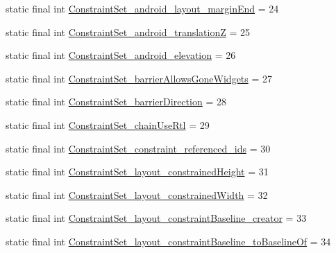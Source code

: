 \begin{DoxyCompactItemize}
\item 
static final int \mbox{\hyperlink{classandroid_1_1support_1_1constraint_1_1_r_1_1styleable_a83bcb97ed6ce0ca89c54e9a368bf3c70}{Constraint\+Set\+\_\+android\+\_\+layout\+\_\+margin\+End}} = 24
\item 
static final int \mbox{\hyperlink{classandroid_1_1support_1_1constraint_1_1_r_1_1styleable_aa97e4df98718576e2033b6f54546a4cf}{Constraint\+Set\+\_\+android\+\_\+translationZ}} = 25
\item 
static final int \mbox{\hyperlink{classandroid_1_1support_1_1constraint_1_1_r_1_1styleable_a1bba70586f967f5e89da0ce11d094afe}{Constraint\+Set\+\_\+android\+\_\+elevation}} = 26
\item 
static final int \mbox{\hyperlink{classandroid_1_1support_1_1constraint_1_1_r_1_1styleable_a4032eefb2166183d384a41be29180f90}{Constraint\+Set\+\_\+barrier\+Allows\+Gone\+Widgets}} = 27
\item 
static final int \mbox{\hyperlink{classandroid_1_1support_1_1constraint_1_1_r_1_1styleable_a029c7bafa6beadb3b8eda9d383459da6}{Constraint\+Set\+\_\+barrier\+Direction}} = 28
\item 
static final int \mbox{\hyperlink{classandroid_1_1support_1_1constraint_1_1_r_1_1styleable_af0420d10b384b7f8340ff46bd6422e79}{Constraint\+Set\+\_\+chain\+Use\+Rtl}} = 29
\item 
static final int \mbox{\hyperlink{classandroid_1_1support_1_1constraint_1_1_r_1_1styleable_a4ab23c187e966b2ab31d8f0e4aaaab98}{Constraint\+Set\+\_\+constraint\+\_\+referenced\+\_\+ids}} = 30
\item 
static final int \mbox{\hyperlink{classandroid_1_1support_1_1constraint_1_1_r_1_1styleable_a2d6b39fd8cf21ecaa4f7b51d9c977b25}{Constraint\+Set\+\_\+layout\+\_\+constrained\+Height}} = 31
\item 
static final int \mbox{\hyperlink{classandroid_1_1support_1_1constraint_1_1_r_1_1styleable_a3ca910d2bfced468b978babf3d42ec73}{Constraint\+Set\+\_\+layout\+\_\+constrained\+Width}} = 32
\item 
static final int \mbox{\hyperlink{classandroid_1_1support_1_1constraint_1_1_r_1_1styleable_a51841e46c2829aa93dbd8a626d493763}{Constraint\+Set\+\_\+layout\+\_\+constraint\+Baseline\+\_\+creator}} = 33
\item 
static final int \mbox{\hyperlink{classandroid_1_1support_1_1constraint_1_1_r_1_1styleable_a97cbd0e27267b5e63933b3d13d15c286}{Constraint\+Set\+\_\+layout\+\_\+constraint\+Baseline\+\_\+to\+Baseline\+Of}} = 34
\item 

\end{DoxyCompactItemize}
